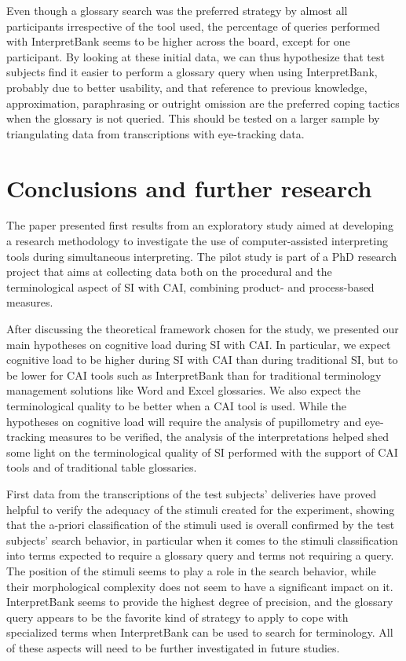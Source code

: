 \documentclass[output=paper]{langsci/langscibook}
\begin{document}
Even though a glossary search was the preferred strategy by almost all participants irrespective of the tool used, the percentage of queries performed with InterpretBank seems to be higher across the board, except for one participant. By looking at these initial data, we can thus hypothesize that test subjects find it easier to perform a glossary query when using InterpretBank, probably due to better usability, and that reference to previous knowledge, approximation, paraphrasing or outright omission are the preferred coping tactics when the glossary is not queried. This should be tested on a larger sample by triangulating data from transcriptions with eye-tracking data. 

\section{Conclusions and further research}

The paper presented first results from an exploratory study aimed at developing a research methodology to investigate the use of computer-assisted interpreting tools during simultaneous interpreting. The pilot study is part of a PhD research project that aims at collecting data both on the procedural and the terminological aspect of SI with CAI, combining product- and process-based measures. 

After discussing the theoretical framework chosen for the study, we presented our main hypotheses on cognitive load during SI with CAI. In particular, we expect cognitive load to be higher during SI with CAI than during traditional SI, but to be lower for CAI tools such as InterpretBank than for traditional terminology management solutions like Word and Excel glossaries. We also expect the terminological quality to be better when a CAI tool is used. While the hypotheses on cognitive load will require the analysis of pupillometry and eye-tracking measures to be verified, the analysis of the interpretations helped shed some light on the terminological quality of SI performed with the support of CAI tools and of traditional table glossaries. 

First data from the transcriptions of the test subjects’ deliveries have proved helpful to verify the adequacy of the stimuli created for the experiment, showing that the a-priori classification of the stimuli used is overall confirmed by the test subjects’ search behavior, in particular when it comes to the stimuli classification into terms expected to require a glossary query and terms not requiring a query. The position of the stimuli seems to play a role in the search behavior, while their morphological complexity does not seem to have a significant impact on it. InterpretBank seems to provide the highest degree of precision, and the glossary query appears to be the favorite kind of strategy to apply to cope with specialized terms when InterpretBank can be used to search for terminology. All of these aspects will need to be further investigated in future studies.
\end{document}
